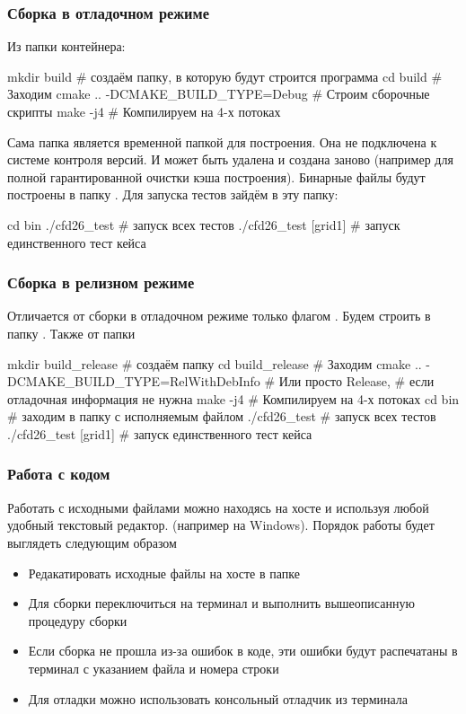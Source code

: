 \subsubsection{Сборка в отладочном режиме}
Из папки \ename{\app} контейнера:
\begin{shelloutput}
mkdir build                        # создаём папку, в которую будут строится программа
cd build                           # Заходим
cmake .. -DCMAKE_BUILD_TYPE=Debug  # Строим сборочные скрипты
make -j4                           # Компилируем на 4-х потоках
\end{shelloutput}
Сама папка  является временной папкой для построения.
Она не подключена к системе контроля версий.  И может быть удалена и создана заново (например для полной гарантированной очистки кэша построения).
Бинарные файлы будут построены в папку \ename{\app\build\bin}.
Для запуска тестов зайдём в эту папку:
\begin{shelloutput}
cd bin
./cfd26_test                # запуск всех тестов
./cfd26_test [grid1]        # запуск единственного тест кейса
\end{shelloutput}

\subsubsection{Сборка в релизном режиме}
Отличается от сборки в отладочном режиме только флагом .
Будем строить в папку .
Также от папки \ename{\app}
\begin{shelloutput}
mkdir build_release                         # создаём папку
cd build_release                            # Заходим
cmake .. -DCMAKE_BUILD_TYPE=RelWithDebInfo  # Или просто Release,
                                            # если отладочная информация не нужна
make -j4                                    # Компилируем на 4-х потоках
cd bin                                      # заходим в папку с исполняемым файлом
./cfd26_test                                # запуск всех тестов
./cfd26_test [grid1]                        # запуск единственного тест кейса
\end{shelloutput}

\subsubsection{Работа с кодом}
Работать с исходными файлами можно находясь на хосте и используя любой удобный текстовый редактор.
(например  на Windows).
Порядок работы будет выглядеть следующим образом
\begin{itemize}
\item Редакатировать исходные файлы на хосте в папке 
\item Для сборки переключиться на терминал и выполнить вышеописанную процедуру сборки
\item Если сборка не прошла из-за ошибок в коде, эти ошибки будут распечатаны в терминал с указанием файла и номера строки
\item Для отладки можно использовать консольный отладчик  из терминала
\end{itemize}

